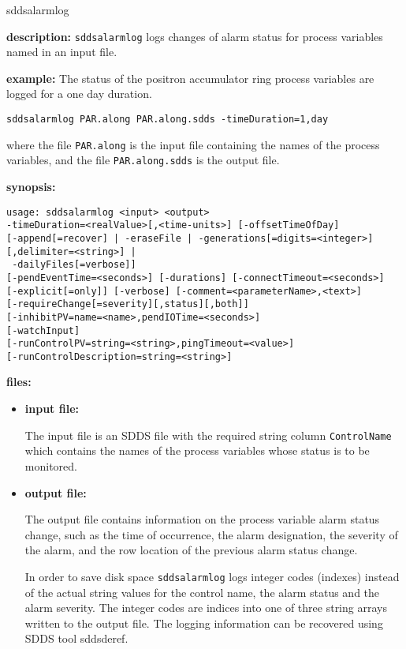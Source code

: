 \begin{sddsprog}{sddsalarmlog}
\item \textbf{description:}
\verb+sddsalarmlog+ logs changes of alarm status for process variables named in an input file.
\item \textbf{example:} 
% 
The status of the positron accumulator ring process variables are logged
for a one day duration.
\begin{verbatim}
sddsalarmlog PAR.along PAR.along.sdds -timeDuration=1,day
\end{verbatim}
where the file \verb+PAR.along+ is the input file containing the names of the
process variables, and the file \verb+PAR.along.sdds+ is the output file.

\item \textbf{synopsis:} 
\begin{verbatim}
usage: sddsalarmlog <input> <output>
-timeDuration=<realValue>[,<time-units>] [-offsetTimeOfDay]
[-append[=recover] | -eraseFile | -generations[=digits=<integer>][,delimiter=<string>] |
 -dailyFiles[=verbose]]
[-pendEventTime=<seconds>] [-durations] [-connectTimeout=<seconds>]
[-explicit[=only]] [-verbose] [-comment=<parameterName>,<text>]
[-requireChange[=severity][,status][,both]]
[-inhibitPV=name=<name>,pendIOTime=<seconds>]
[-watchInput]
[-runControlPV=string=<string>,pingTimeout=<value>]
[-runControlDescription=string=<string>]
\end{verbatim}

\item \textbf{files:}
\begin{itemize}
\item \textbf{input file:}\par
The input file is an SDDS file with the required string column {\tt ControlName}
which contains the names of the process variables whose status is to be monitored.

\item \textbf{output file:}\par
The output file contains information on the process variable alarm status
change, such as the time of occurrence, the alarm designation, the severity of the alarm, and the
row location of the previous alarm status change.

In order to save disk space {\tt sddsalarmlog} logs integer codes
(indexes) instead of the actual string values for the control name,
the alarm status and the alarm severity. The integer codes are indices
into one of three string arrays written to the output file. The logging information
can be recovered using SDDS tool sddsderef. 


\end{itemize}
\end{sddsprog}
